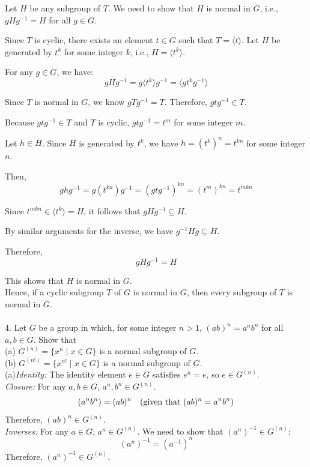 Let \( H \) be any subgroup of \( T \). We need to show that \( H \) is normal in \( G \), i.e., \( gHg^{-1} = H \) for all \( g \in G \).

Since \( T \) is cyclic, there exists an element \( t \in G \) such that \( T = \langle t \rangle \). Let \( H \) be generated by \( t^k \) for some integer \( k \), i.e., \( H = \langle t^k \rangle \).

For any \( g \in G \), we have:
\[ gHg^{-1} = g \langle t^k \rangle g^{-1} = \langle gt^kg^{-1} \rangle \]

Since \( T \) is normal in \( G \), we know \( gTg^{-1} = T \). Therefore, \( gtg^{-1} \in T \).

Because \( gtg^{-1} \in T \) and \( T \) is cyclic, \( gtg^{-1} = t^m \) for some integer \( m \).

Let \( h \in H \). Since \( H \) is generated by \( t^k \), we have \( h = (t^k)^n = t^{kn} \) for some integer \( n \).

Then,
\[ ghg^{-1} = g(t^{kn})g^{-1} = (gtg^{-1})^{kn} = (t^m)^{kn} = t^{mkn} \]

Since \( t^{mkn} \in \langle t^k \rangle = H \), it follows that \( gHg^{-1} \subseteq H \).

By similar arguments for the inverse, we have \( g^{-1}Hg \subseteq H \).

Therefore,
\[ gHg^{-1} = H \]

This shows that \( H \) is normal in \( G \).
\\
Hence, if a cyclic subgroup \( T \) of \( G \) is normal in \( G \), then every subgroup of \( T \) is normal in \( G \).
\\
\\
4. Let \( G \) be a group in which, for some integer \( n > 1 \), \( (ab)^n = a^n b^n \) for all \( a, b \in G \). Show that \\
(a) \( G^{(n)} = \{ x^n \mid x \in G \} \) is a normal subgroup of \( G \).\\ 
(b) \( G^{(n!)} = \{ x^{n!} \mid x \in G \} \) is a normal subgroup of \( G \).
\\
{(a)}\textit{Identity:} The identity element \( e \in G \) satisfies \( e^n = e \), so \( e \in G^{(n)} \).
\\
\textit{Closure:} For any \( a, b \in G \), \( a^n, b^n \in G^{(n)} \).
   \[
   (a^n b^n) = (ab)^n \quad \text{(given that \( (ab)^n = a^n b^n \))}
   \]
   Therefore, \( (ab)^n \in G^{(n)} \).
   \\
\textit{Inverses:} For any \( a \in G \), \( a^n \in G^{(n)} \). We need to show that \( (a^n)^{-1} \in G^{(n)} \):
   \[
   (a^n)^{-1} = (a^{-1})^n
   \]
   Therefore, \( (a^n)^{-1} \in G^{(n)} \).

